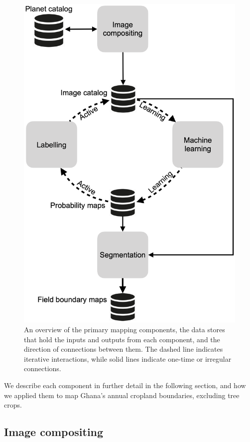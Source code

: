 \documentclass[11pt,a4paper]{article}
\begin{document}
\begin{figure}

{\centering \includegraphics[width=0.5\linewidth]{figures/figure1} 

}

\caption{An overview of the primary mapping components, the data stores that hold the inputs and outputs from each component, and the direction of connections between them. The dashed line indicates iterative interactions, while solid lines indicate one-time or irregular connections.}\label{fig:systemoverview}
\end{figure}

We describe each component in further detail in the following section,
and how we applied them to map Ghana's annual cropland boundaries,
excluding tree crops.

\hypertarget{image-compositing}{%
\subsection{Image compositing}\label{image-compositing}}
\end{document}
